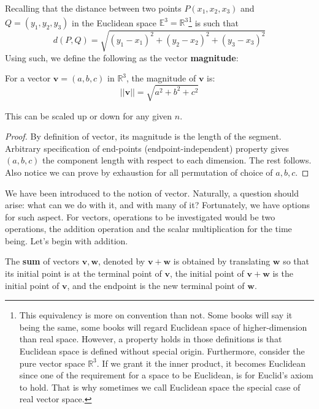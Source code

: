 Recalling that the distance between two points $P(x_{1},x_{2},x_{3})$ and $Q=(y_{1},y_{2},y_{3})$ in the Euclidean space $\mathbb{E}^{3}=\mathbb{R}^{3}$\footnote{This equivalency is more on convention than not. Some books will say it being the same, some books will regard Euclidean space of higher-dimension than real space. However, a property holds in those definitions is that Euclidean space is defined without special origin. Furthermore, consider the pure vector space $\mathbb{R}^{3}$. If we grant it the inner product, it becomes Euclidean since one of the requirement for a space to be Euclidean, is for Euclid's axiom to hold. That is why sometimes we call Euclidean space the special case of real vector space.} is such that
\begin{equation}
    d(P,Q) = \sqrt{(y_{1}-x_{1})^{2} + (y_{2}-x_{2})^{2} + (y_{3}-x_{3})^{2}}
\end{equation}
Using such, we define the following as the vector \textbf{magnitude}:
\begin{theorem}
    For a vector $\mathbf{v}=(a,b,c)$ in $\mathbb{R}^3$, the magnitude of $\mathbf{v}$ is: 
    \begin{equation}
        \lvert\lvert \mathbf{v} \rvert\rvert = \sqrt{a^{2}+b^{2}+c^{2}}
    \end{equation}
\end{theorem}
This can be scaled up or down for any given $n$.
\begin{proof}
    By definition of vector, its magnitude is the length of the segment. Arbitrary specification of end-points (endpoint-independent) property gives $(a,b,c)$ the component length with respect to each dimension. The rest follows. Also notice we can prove by exhaustion for all permutation of choice of $a,b,c$. 
\end{proof}

We have been introduced to the notion of vector. Naturally, a question should arise: what can we do with it, and with many of it? Fortunately, we have options for such aspect. For vectors, operations to be investigated would be two operations, the addition operation and the scalar multiplication for the time being. Let's begin with addition.

\begin{theorem}
    The \textbf{sum} of vectors $\mathbf{v},\mathbf{w}$, denoted by $\mathbf{v}+\mathbf{w}$ is obtained by translating $\mathbf{w}$ so that its initial point is at the terminal point of $\mathbf{v}$, the initial point of $\mathbf{v}+\mathbf{w}$ is the initial point of $\mathbf{v}$, and the endpoint is the new terminal point of $\mathbf{w}$.
\end{theorem}

